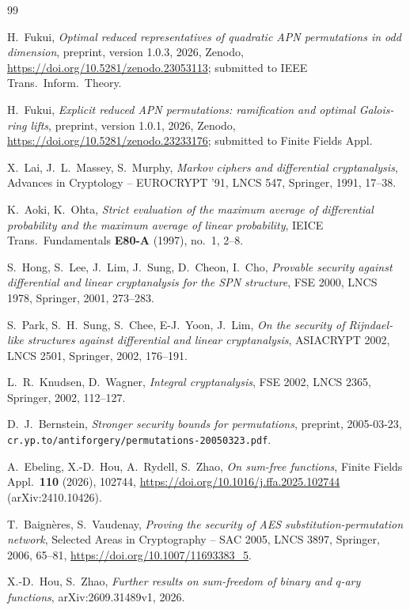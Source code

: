 \begin{thebibliography}{99}

H.~Fukui, \emph{Optimal reduced representatives of quadratic APN permutations in odd dimension},
preprint, version 1.0.3, 2026, Zenodo, \url{https://doi.org/10.5281/zenodo.23053113}; submitted to IEEE Trans.\ Inform.\ Theory.

H.~Fukui, \emph{Explicit reduced APN permutations: ramification and optimal Galois-ring lifts},
preprint, version 1.0.1, 2026, Zenodo, \url{https://doi.org/10.5281/zenodo.23233176}; submitted to Finite Fields Appl.

X.~Lai, J.~L.~Massey, S.~Murphy, \emph{Markov ciphers and differential cryptanalysis},
Advances in Cryptology -- EUROCRYPT '91, LNCS 547, Springer, 1991, 17--38.

K.~Aoki, K.~Ohta, \emph{Strict evaluation of the maximum average of differential probability and
the maximum average of linear probability}, IEICE Trans.\ Fundamentals \textbf{E80-A} (1997), no.~1, 2--8.

S.~Hong, S.~Lee, J.~Lim, J.~Sung, D.~Cheon, I.~Cho, \emph{Provable security against differential
and linear cryptanalysis for the SPN structure}, FSE 2000, LNCS 1978, Springer, 2001, 273--283.

S.~Park, S.~H.~Sung, S.~Chee, E-J.~Yoon, J.~Lim, \emph{On the security of Rijndael-like structures
against differential and linear cryptanalysis}, ASIACRYPT 2002, LNCS 2501, Springer, 2002, 176--191.

L.~R.~Knudsen, D.~Wagner, \emph{Integral cryptanalysis}, FSE 2002, LNCS 2365, Springer, 2002, 112--127.

D.~J.~Bernstein, \emph{Stronger security bounds for permutations}, preprint, 2005-03-23,
\texttt{cr.yp.to/antiforgery/permutations-20050323.pdf}.

A.~Ebeling, X.-D.~Hou, A.~Rydell, S.~Zhao, \emph{On sum-free functions},
Finite Fields Appl.\ \textbf{110} (2026), 102744, \url{https://doi.org/10.1016/j.ffa.2025.102744} (arXiv:2410.10426).

T.~Baign\`eres, S.~Vaudenay, \emph{Proving the security of AES substitution-permutation network}, Selected Areas in
Cryptography -- SAC 2005, LNCS 3897, Springer, 2006, 65--81, \url{https://doi.org/10.1007/11693383_5}.

X.-D.~Hou, S.~Zhao, \emph{Further results on sum-freedom of binary and $q$-ary functions}, arXiv:2609.31489v1, 2026.

\end{thebibliography}
